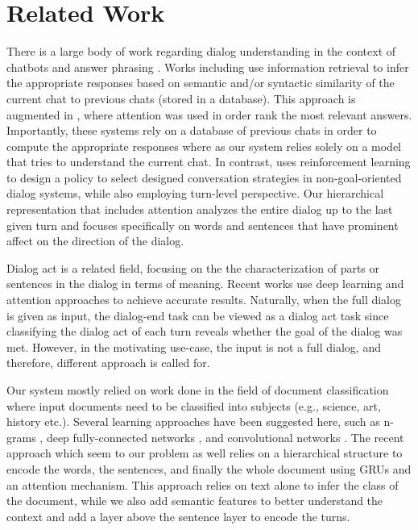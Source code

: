 \section{Related Work}\label{sec:related}
There is a large body of work regarding dialog 
understanding in the context of chatbots and answer phrasing 
\cite{Jia09,ShawarA03,ShawarA08,BanchsK14,iris,noGoal,QiuLWGCZCHC17,YuXBR16,yu2016chatbot}. 
Works including \cite{iris,noGoal} use information 
retrieval to infer the appropriate responses based on 
semantic and/or syntactic similarity of the 
current chat to previous chats (stored in a database).  
This approach is augmented in \cite{QiuLWGCZCHC17}, 
where attention \cite{BahdanauCB14} was used in order 
rank the most relevant answers. 
Importantly, these systems rely on a database of previous 
chats in order to compute the appropriate responses where as 
our system relies solely on a model that tries to understand 
the current chat. 
In contrast, \cite{YuXBR16} uses reinforcement learning 
to design a policy to select designed
conversation strategies in non-goal-oriented dialog
systems, while also employing turn-level perspective. 
Our hierarchical representation 
that includes attention analyzes the entire dialog up to the last 
given turn and focuses specifically on words and sentences that 
have prominent affect on the direction of the dialog.

Dialog act \cite{DBLP:conf/icassp/JiB05,DBLP:conf/coling/WermterL96,AngLS05,SurendranL06,li2016multi,ortega2017neural} 
is a related field, focusing on the 
the characterization of parts or sentences in the dialog 
in terms of meaning. Recent works \cite{li2016multi,ortega2017neural} use 
deep learning and attention approaches to achieve accurate results. 
Naturally, when the full dialog is given as input, the dialog-end task 
can be viewed as a dialog act task since classifying the dialog act 
of each turn reveals whether the goal of the dialog was met. 
However, in the motivating use-case, the input is not a full dialog, and 
therefore, different approach is called for. 

Our system mostly relied on work 
done in the field of document classification \cite{attention,...}  where input documents need to be classified into subjects 
(e.g., science, art, history etc.). 
Several learning approaches have been suggested here, 
such as n-grams \cite{...}, deep fully-connected networks \cite{...}, 
and convolutional networks \cite{...}. The recent approach \cite{attention} 
which seem to our problem as well relies on a hierarchical structure to 
encode the words, the sentences, and finally the whole document 
using GRUs and an attention mechanism. 
This approach relies on text alone to infer the class 
of the document, while we also add semantic features to better 
understand the context and add a layer above the sentence layer 
to encode the turns. 
